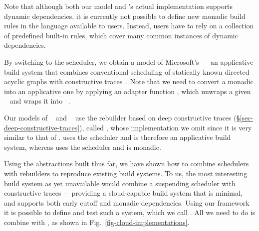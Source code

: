Note that although both our model and \Bazel's actual implementation supports
dynamic dependencies, it is currently not possible to define new monadic build
rules in the language available to users. Instead, users have to rely on a
collection of predefined built-in rules, which cover many
common instances of dynamic dependencies.

By switching to the  scheduler, we obtain a model of
Microsoft's \CloudBuild~-- an applicative build system that combines
conventional scheduling of statically known directed acyclic graphs
with constructive traces~\cite{esfahani2016cloudbuild}. Note that
we need to convert a monadic  into an applicative one by
applying an adapter function , which unwraps a given
~ and wraps it into ~.

Our models of \Buck~\cite{buck} and \Nix~\cite{dolstra2004nix} use the rebuilder
based on deep constructive traces (\S\ref{sec-deep-constructive-traces}), called
, whose implementation we omit since it is very similar to that
of . \Buck uses the  scheduler and is therefore
an applicative build system, whereas \Nix uses the  scheduler and
is monadic.


Using the abstractions built thus far, we have shown how to combine schedulers
with rebuilders to reproduce existing build systems. To us, the most interesting
build system as yet unavailable would combine a suspending scheduler with
constructive traces~--~providing a cloud-capable build system that is minimal,
and supports both early cutoff and monadic dependencies. Using our framework it
is possible to define and test such a system, which we call \Cloud \Shake. All
we need to do is combine  with ,
as shown in Fig.~\ref{fig-cloud-implementations}.
